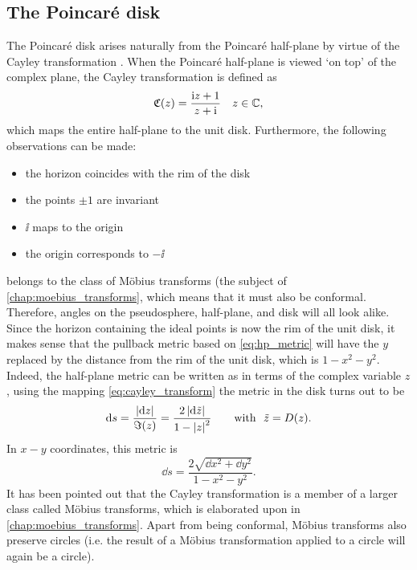 \subsection{The Poincaré disk}
\label{ssec:poincare_disk}
The Poincaré disk arises naturally from the Poincaré half-plane by virtue of the Cayley transformation
. When the Poincaré half-plane is viewed `on top' of the complex plane, the Cayley transformation  is defined as
\begin{equation}
    \mathfrak{C}(z) = \frac{\mathrm{i} z + 1}{z + \mathrm{i}}\quad z \in \mathbb{C},
    \label{eq:cayley_transform}
\end{equation}
which maps the entire half-plane to the unit disk. Furthermore, the following observations can be made:
\begin{itemize}[itemsep=0.2ex,topsep=0.2ex]
    \item the horizon coincides with the rim of the disk
    \item the points \(\pm1\) are invariant
    \item \(\ii\) maps to the origin
    \item the origin corresponds to \(-\ii\)
\end{itemize}
 belongs to the class of Möbius transforms (the subject of \cref{chap:moebius_transforms}, which means that it must also be conformal. Therefore, angles on the pseudosphere, half-plane, and disk will all look alike. Since the horizon containing the ideal points is now the rim of the unit disk, it makes sense that the pullback metric based on \cref{eq:hp_metric} will have the $y$ replaced by the distance from the rim of the unit disk, which is $1 - x^2 - y^2$. Indeed, the half-plane metric can be written as in terms of the complex variable $z$, using the mapping \cref{eq:cayley_transform} the metric in the disk turns out to be \cite{Needham1997}
\[
    \dd{s} = \frac{\abs{\dd{z}}}{\imaginary(z)} = \frac{2\,\abs{\dd{\tilde{z}}}}{1 - \abs{z}^2} \qquad \text{with }\ \tilde{z} = D(z).
\]
In \(x-y\) coordinates, this metric is
\begin{equation}
    \dd{s} = \frac{2\sqrt{\dd{x}^2 + \dd{y}^2}}{1 - x^2 - y^2}.
\end{equation}
It has been pointed out that the Cayley transformation is a member of a larger class called Möbius transforms, which is elaborated upon in \cref{chap:moebius_transforms}. Apart from being conformal, Möbius transforms also preserve circles (i.e. the result of a Möbius transformation applied to a circle will again be a circle). 

